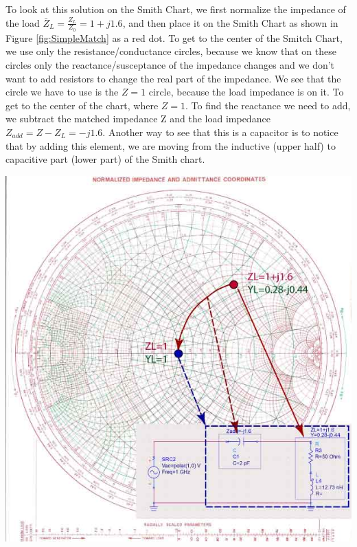 \documentclass{ximera}
\begin{document}
To look at this solution on the Smith Chart, we first normalize the impedance of the load $\bar{Z}_L=\frac{Z_L}{Z_0}=1+j1.6$, and then place it on the Smith Chart as shown in Figure \ref{fig:SimpleMatch} as a red dot. To get to the center of the Smitch Chart, we use only the resistance/conductance circles, because we know that on these circles only the reactance/susceptance of the impedance changes and we don't want to add resistors to change the real part of the impedance. We see that the circle we have to use is the $Z=1$ circle, because the load impedance  is on it.  To get to the center of the chart, where $Z=1$. To find the reactance we need to add, we subtract  the matched impedance Z and the load impedance $Z_{add}=Z- Z_L=-j1.6$. Another way to see that this is a capacitor is to notice that by adding this element, we are moving from the inductive (upper half) to capacitive part (lower part) of the Smith chart. 

\begin{image}
\includegraphics{../jpg/test.jpg}
\label{fig:SimpleMatch1}
\end{image}
\end{document}
